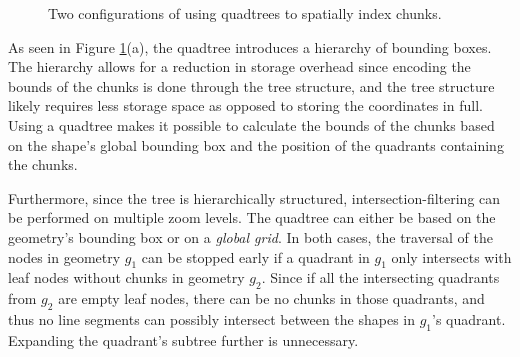 \begin{figure}[htbp]%
    \centering
    \qquad
    \caption{Two configurations of using quadtrees to spatially index chunks.}%
    \label{fig:chkbboxquad}%
\end{figure}

As seen in Figure \ref{fig:chkbboxquad}(a), the quadtree introduces a hierarchy of bounding boxes. The hierarchy allows for a reduction in storage overhead since encoding the bounds of the chunks is done through the tree structure, and the tree structure likely requires less storage space as opposed to storing the coordinates in full. Using a quadtree makes it possible to calculate the bounds of the chunks based on the shape's global bounding box and the position of the quadrants containing the chunks.

Furthermore, since the tree is hierarchically structured, intersection-filtering can be performed on multiple zoom levels. The quadtree can either be based on the geometry's bounding box or on a \emph{global grid}. In both cases, the traversal of the nodes in geometry $g_1$ can be stopped early if a quadrant in $g_1$ only intersects with leaf nodes without chunks in geometry $g_2$. Since if all the intersecting quadrants from $g_2$ are empty leaf nodes, there can be no chunks in those quadrants, and thus no line segments can possibly intersect between the shapes in $g_1$'s quadrant. Expanding the quadrant's subtree further is unnecessary.

